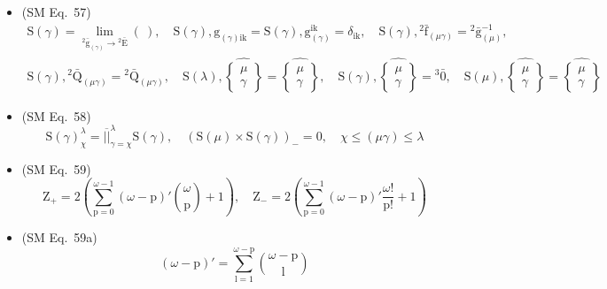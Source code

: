 \documentclass[12pt]{article}
\begin{document}
\begin{itemize}[label={},leftmargin=0pt]
    \item (SM Eq.\ 57) 
    \[
    \begin{gathered}
    \mathrm{S}(\gamma) = \lim_{{}^2\bar{\mathrm{g}}_{(\gamma)} \to {}^2\bar{\mathrm{E}}} (\ ), \quad \mathrm{S}(\gamma), \mathrm{g}_{(\gamma)\mathrm{ik}} = \mathrm{S}(\gamma), \mathrm{g}_{(\gamma)}^{\mathrm{ik}} = \delta_{\mathrm{ik}}, \quad \mathrm{S}(\gamma), {}^2\bar{\mathrm{f}}_{(\mu\gamma)} = {}^2\bar{\mathrm{g}}_{(\mu)}^{-1}, \\
    \mathrm{S}(\gamma), {}^2\bar{\mathrm{Q}}_{(\mu\gamma)} = {}^2\bar{\mathrm{Q}}_{(\mu\gamma)}, \quad \mathrm{S}(\lambda), \widehat{\left\{ \begin{smallmatrix} \mu \\ \gamma \end{smallmatrix} \right\}} = \widehat{\left\{ \begin{smallmatrix} \mu \\ \gamma \end{smallmatrix} \right\}}, \quad \mathrm{S}(\gamma), \widehat{\left\{ \begin{smallmatrix} \mu \\ \gamma \end{smallmatrix} \right\}} = {}^3\bar{0}, \quad \mathrm{S}(\mu), \widehat{\left\{ \begin{smallmatrix} \mu \\ \gamma \end{smallmatrix} \right\}} = \widehat{\left\{ \begin{smallmatrix} \mu \\ \gamma \end{smallmatrix} \right\}}
    \end{gathered}
    \]

    \item (SM Eq.\ 58) 
    \[
    \mathrm{S}(\gamma)_\chi^\lambda = \overline{||}_{\gamma=\chi}^\lambda \mathrm{S}(\gamma), \quad \left( \mathrm{S}(\mu) \times \mathrm{S}(\gamma) \right)_- = 0, \quad \chi \le (\mu\gamma) \le \lambda
    \]

    \item (SM Eq.\ 59) 
    \[
    \mathrm{Z}_+ = 2\left( \sum_{\mathrm{p}=0}^{\omega-1} (\omega-\mathrm{p})' \binom{\omega}{\mathrm{p}} + 1 \right), \quad \mathrm{Z}_- = 2\left( \sum_{\mathrm{p}=0}^{\omega-1} (\omega-\mathrm{p})' \frac{\omega!}{\mathrm{p}!} + 1 \right)
    \]

    \item (SM Eq.\ 59a) 
    \[
    (\omega-\mathrm{p})' = \sum_{\mathrm{l}=1}^{\omega-\mathrm{p}} \binom{\omega-\mathrm{p}}{\mathrm{l}}
    \]


\end{itemize}
\end{document}
